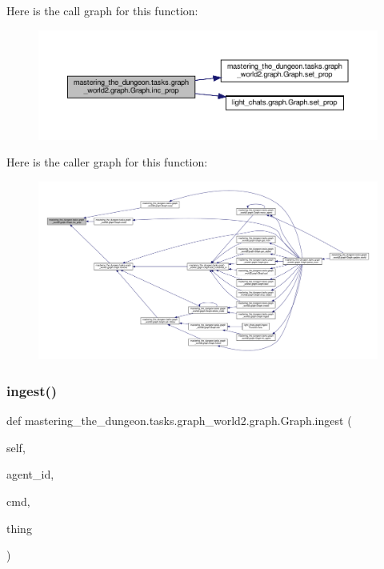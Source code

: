 Here is the call graph for this function\+:
\nopagebreak
\begin{figure}[H]
\begin{center}
\leavevmode
\includegraphics[width=350pt]{classmastering__the__dungeon_1_1tasks_1_1graph__world2_1_1graph_1_1Graph_aafec1a36e3d07f03b20cca875acde01f_cgraph}
\end{center}
\end{figure}
Here is the caller graph for this function\+:
\nopagebreak
\begin{figure}[H]
\begin{center}
\leavevmode
\includegraphics[width=350pt]{classmastering__the__dungeon_1_1tasks_1_1graph__world2_1_1graph_1_1Graph_aafec1a36e3d07f03b20cca875acde01f_icgraph}
\end{center}
\end{figure}
\mbox{\label{classmastering__the__dungeon_1_1tasks_1_1graph__world2_1_1graph_1_1Graph_ae7815030738f1dab61ff8f47de78442d}} 
\subsubsection{\texorpdfstring{ingest()}{ingest()}}
{\footnotesize\ttfamily def mastering\+\_\+the\+\_\+dungeon.\+tasks.\+graph\+\_\+world2.\+graph.\+Graph.\+ingest (\begin{DoxyParamCaption}\item[{}]{self,  }\item[{}]{agent\+\_\+id,  }\item[{}]{cmd,  }\item[{}]{thing }\end{DoxyParamCaption})}



